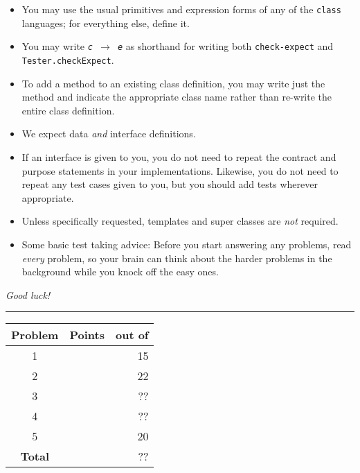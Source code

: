 \documentclass[12pt]{article}                   %
\newcommand\code[1]{\texttt{#1}}
\begin{document}
\noindent\begin{minipage}{8cm}\sloppy
\begin{itemize}
\item You may use the usual primitives and expression forms of any of
  the \code{class} languages; for everything else, define it.

\item You may write {\tt {\slshape c} $\rightarrow$ {\slshape e}} as
  shorthand for writing both {\tt check-expect} and {\tt
    Tester.checkExpect}.

\item To add a method to an existing class definition, you
  may write just the method and indicate the appropriate class name
  rather than re-write the entire class definition.

\item We expect data \emph{and} interface definitions.

\item If an interface is given to you, you do not need to repeat the
  contract and purpose statements in your implementations.  Likewise,
  you do not need to repeat any test cases given to you, but you
  should add tests wherever appropriate.



\item Unless specifically requested, templates and super classes are
  \emph{not} required.

\item Some basic test taking advice: Before you start answering
any problems, read \emph{every} problem, so your brain can  think
about the harder problems in the background while you knock off the easy ones.
\end{itemize}

\bigskip

\emph{Good luck!}
\end{minipage}\hfil\begin{minipage}[t]{6cm}
\rule{1cm}{0pt}\begin{tabular}{|c|l|@{/}r|}
\hline
{\bf Problem} & Points & out of \\ \hline
1 & & 15\\ \hline
2 & & 22\\ \hline
3 & & ??\\ \hline
4 & & ??\\ \hline
5 & & 20\\ \hline
{\bf Total} & & ?? \\ \hline
\end{tabular}
\end{minipage}
\end{document}

